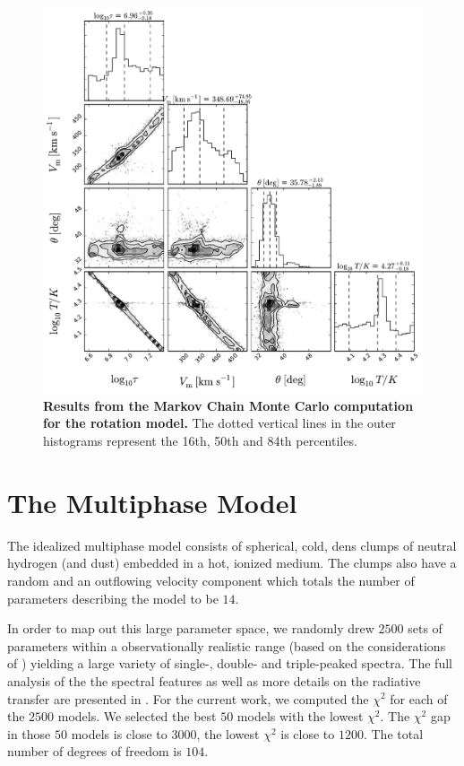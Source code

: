 \documentclass[a4paper, usenatbib, 12pt]{article}
\begin{document}
{\begin{figure}
\begin{center}
\includegraphics[width=1.0\textwidth]{emcee_results.pdf}
\caption{{\bf Results from the Markov Chain Monte Carlo computation for
    the rotation model.} The dotted vertical lines in the outer histograms 
	represent the 16th, 50th and 84th percentiles. \label{emceeresults}} 
\end{center}
\end{figure}

\section*{The Multiphase Model} 

The idealized multiphase model consists of spherical, cold, dens
clumps of neutral hydrogen (and dust) embedded in a hot, ionized
medium. 
The clumps also have a random and an outflowing velocity
component which totals the number of parameters describing the model
to be $14$. 

In order to map out this large parameter space, we randomly drew
$2500$ sets of parameters within a observationally realistic range
(based on the considerations of \cite{Laursen2013ApJ...766..124L})
yielding a large variety of single-, double- and triple-peaked
spectra. 
The full analysis of the the spectral features as well as
more details on the radiative transfer are presented in
\cite{Gronke2016}.    
 For the current work, we computed the $\chi^2$ for each of the $2500$
models. We selected the best $50$ models with the lowest $\chi^2$. The
$\chi^2$ gap in those $50$ models is close to $3000$, the lowest
$\chi^2$ is close to $1200$. The total number of degrees of freedom is
$104$.    

}
\end{document}
